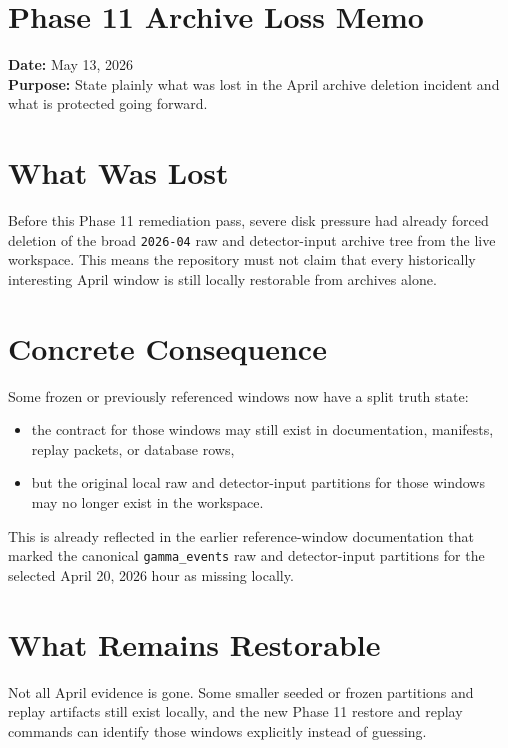 \documentclass{article}
\begin{document}
\section*{Phase 11 Archive Loss Memo}

\textbf{Date:} May 13, 2026\\
\textbf{Purpose:} State plainly what was lost in the April archive deletion incident and what is protected going forward.

\section*{What Was Lost}
Before this Phase 11 remediation pass, severe disk pressure had already forced deletion of the broad \texttt{2026-04} raw and detector-input archive tree from the live workspace. This means the repository must not claim that every historically interesting April window is still locally restorable from archives alone.

\section*{Concrete Consequence}
Some frozen or previously referenced windows now have a split truth state:
\begin{itemize}
\item the contract for those windows may still exist in documentation, manifests, replay packets, or database rows,
\item but the original local raw and detector-input partitions for those windows may no longer exist in the workspace.
\end{itemize}

This is already reflected in the earlier reference-window documentation that marked the canonical \texttt{gamma\_events} raw and detector-input partitions for the selected April 20, 2026 hour as missing locally.

\section*{What Remains Restorable}
Not all April evidence is gone. Some smaller seeded or frozen partitions and replay artifacts still exist locally, and the new Phase 11 restore and replay commands can identify those windows explicitly instead of guessing.
\end{document}
